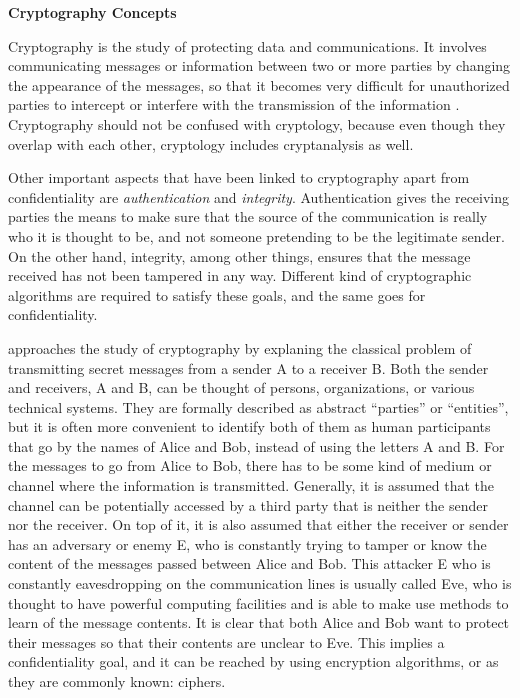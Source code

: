 \textbf{Cryptography Concepts}

Cryptography is the study of protecting data and communications. It involves communicating messages or information between two or more parties by changing the appearance of the messages, so that it becomes very difficult for unauthorized parties to intercept or interfere with the transmission of the information \cite{IntroCryptoMath}. Cryptography should not be confused with cryptology, because even though they overlap with each other, cryptology includes cryptanalysis as well. 

Other important aspects that have been linked to cryptography apart from confidentiality are \textit{authentication} and \textit{integrity}. Authentication gives the receiving parties the means to make sure that the source of the communication is really who it is thought to be, and not someone pretending to be the legitimate sender. On the other hand, integrity, among other things, ensures that the message received has not been tampered in any way. Different kind of cryptographic algorithms are required to satisfy these goals, and the same goes for confidentiality.

\cite{CryptoIT} approaches the study of cryptography by explaning the classical problem of transmitting secret messages from a sender A to a receiver B. Both the sender and receivers, A and B, can be thought of persons, organizations, or various technical systems.  They are formally described as abstract ``parties'' or ``entities'', but it is often more convenient to identify both of them as human participants that go by the names of Alice and Bob, instead of using the letters A and B.
For the messages to go from Alice to Bob, there has to be some kind of medium or channel where the information is transmitted. Generally, it is assumed that the channel can be potentially accessed by a third party that is neither the sender nor the receiver. On top of it, it is also assumed that either the receiver or sender has an adversary or enemy E, who is constantly trying to tamper or know the content of the messages passed between Alice and Bob. This attacker E who is constantly eavesdropping on the communication lines is usually called Eve, who is thought to have powerful computing facilities and is able to make use methods to learn of the message contents.  It is clear that both Alice and Bob want to protect their messages so that their contents are unclear to Eve. This implies a confidentiality goal, and it can be reached by using encryption algorithms, or as they are commonly known: ciphers.

